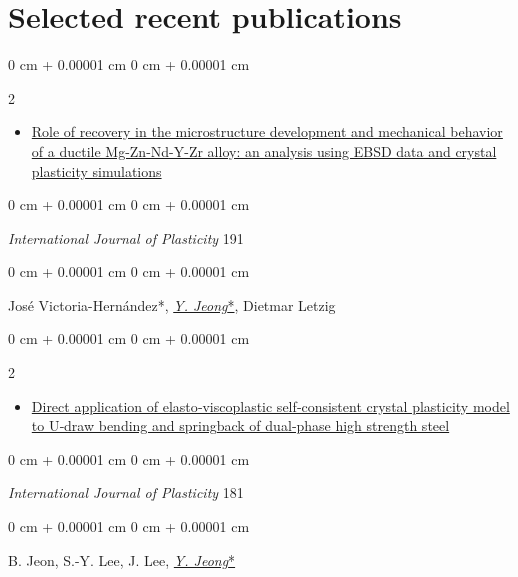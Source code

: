 \documentclass[10pt, letterpaper]{article}
\newenvironment{highlights}{
    \begin{itemize}[
        topsep=0.10 cm,
        parsep=0.10 cm,
        partopsep=0pt,
        itemsep=0pt,
        leftmargin=0 cm + 10pt
    ]
}{
    \end{itemize}
} %
\newenvironment{onecolentry}{
    \begin{adjustwidth}{
        0 cm + 0.00001 cm
    }{
        0 cm + 0.00001 cm
    }
}{
    \end{adjustwidth}
} %
\newenvironment{twocolentry}[2][]{
    \onecolentry
    \def\secondColumn{#2}
    \setcolumnwidth{\fill, 4.5 cm}
    \begin{paracol}{2}
}{
    \switchcolumn \raggedleft \secondColumn
    \end{paracol}
    \endonecolentry
} %
\begin{document}
    \section{Selected recent publications}
    \begin{samepage}

            \begin{twocolentry}{2025}
                \begin{highlights}
                \item\href{https://doi.org/10.1016/j.ijplas.2025.104380}{Role of recovery in the microstructure development and mechanical behavior of a ductile Mg-Zn-Nd-Y-Zr alloy: an analysis using EBSD data and crystal plasticity simulations}
                \end{highlights}
            \end{twocolentry}
            \begin{onecolentry}
                {\it International Journal of Plasticity} 191
            \end{onecolentry}
            \begin{onecolentry}
              José Victoria-Hernández*, {\underline{\textit{Y. Jeong}*}}, Dietmar Letzig
            \end{onecolentry}
            \vspace{0.10 cm}



            \begin{twocolentry}{2024}
                \begin{highlights}
                \item\href{https://doi.org/10.1016/j.ijplas.2024.104098}{Direct application of elasto‑viscoplastic self‑consistent crystal plasticity model to U‑draw bending and springback of dual‑phase high strength steel}
                \end{highlights}
            \end{twocolentry}
            \begin{onecolentry}
                {\it International Journal of Plasticity} 181
            \end{onecolentry}
            \begin{onecolentry}
              B. Jeon, S.-Y. Lee, J. Lee, {\underline{\textit{Y. Jeong}*}}
            \end{onecolentry}
            \vspace{0.10 cm}




\end{samepage}
\end{document}
